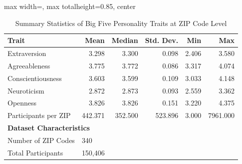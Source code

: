 \begin{table}[htbp]
\centering
\caption{Summary Statistics of Big Five Personality Traits at ZIP Code Level}
\label{tab:personality_summary}
\begin{adjustbox}{max width=\linewidth, max totalheight=0.85\textheight, center}
\begin{tabular}{lrrrrr}
\toprule
\textbf{Trait} & \textbf{Mean} & \textbf{Median} & \textbf{Std. Dev.} & \textbf{Min} & \textbf{Max} \\
\midrule
Extraversion & 3.298 & 3.300 & 0.098 & 2.406 & 3.580 \\
Agreeableness & 3.775 & 3.772 & 0.086 & 3.317 & 4.074 \\
Conscientiousness & 3.603 & 3.599 & 0.109 & 3.033 & 4.148 \\
Neuroticism & 2.872 & 2.873 & 0.093 & 2.559 & 3.362 \\
Openness & 3.826 & 3.826 & 0.151 & 3.220 & 4.375 \\
Participants per ZIP & 442.371 & 352.500 & 523.896 & 3.000 & 7961.000 \\
\midrule
\multicolumn{6}{l}{\textbf{Dataset Characteristics}} \\
\midrule
Number of ZIP Codes & \multicolumn{5}{l}{340} \\
Total Participants & \multicolumn{5}{l}{150,406} \\
\bottomrule
\end{tabular}
\end{adjustbox}
\end{table}
